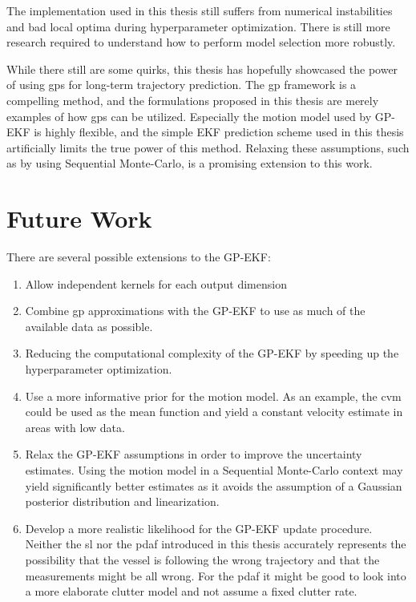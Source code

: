 The implementation used in this thesis still suffers from numerical instabilities and bad local optima during hyperparameter optimization. There is still more research required to understand how to perform model selection more robustly. 

While there still are some quirks, this thesis has hopefully showcased the power of using \acrshort{gp}s for long-term trajectory prediction. The \acrshort{gp} framework is a compelling method, and the formulations proposed in this thesis are merely examples of how \acrshort{gp}s can be utilized. Especially the motion model used by GP-EKF is highly flexible, and the simple EKF prediction scheme used in this thesis artificially limits the true power of this method. Relaxing these assumptions, such as by using Sequential Monte-Carlo, is a promising extension to this work. 


\section{Future Work}
There are several possible extensions to the GP-EKF:
\begin{enumerate}
    \item Allow independent kernels for each output dimension
    \item Combine \acrshort{gp} approximations with the GP-EKF to use as much of the available data as possible.
    \item Reducing the computational complexity of the GP-EKF by speeding up the hyperparameter optimization.
    \item Use a more informative prior for the motion model. As an example, the \acrshort{cvm} could be used as the mean function and yield a constant velocity estimate in areas with low data.
    \item Relax the GP-EKF assumptions in order to improve the uncertainty estimates. Using the motion model in a Sequential Monte-Carlo context may yield significantly better estimates as it avoids the assumption of a Gaussian posterior distribution and linearization.  
    \item Develop a more realistic likelihood for the GP-EKF update procedure. Neither the \acrshort{sl} nor the \acrshort{pdaf} introduced in this thesis accurately represents the possibility that the vessel is following the wrong trajectory and that the measurements might be all wrong. For the \acrshort{pdaf} it might be good to look into a more elaborate clutter model and not assume a fixed clutter rate.  
\end{enumerate}
